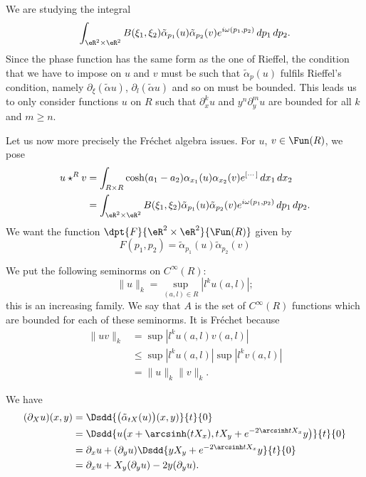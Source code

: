 We are studying the integral
\[ 
  \int_{\eR^2\times\eR^2} B(\xi_1,\xi_2)\tilde\alpha_{p_1}(u)\tilde\alpha_{p_2}(v)e^{i\omega(p_1,p_2)}\,dp_1\,dp_2.
\]
Since the phase function has the same form as the one of Rieffel, the condition that we have to impose on $u$ and $v$ must be such that $\tilde\alpha_p(u)$ fulfils Rieffel's condition, namely $\partial_{\xi}(\tilde\alpha u)$, $\partial_l(\tilde\alpha u)$ and so on must be bounded. This leads us to only consider functions $u$ on $R$ such that $\partial_x^ku$ and $y^n\partial^m_yu$ are bounded for all $k$ and $m\geq n$.


Let us now more precisely the Fréchet algebra issues. For $u$, $v\in\Fun(R)$, we pose
\[ 
\begin{aligned}
   u\star^R v&=\int_{R\times R} \cosh(a_1-a_2)\alpha_{x_1}(u)\alpha_{x_2}(v)e^{[\cdots]}\,dx_1\,dx_2\\
	&=\int_{\eR^2\times\eR^2}B(\xi_1,\xi_2)\tilde\alpha_{p_1}(u)\tilde\alpha_{p_2}(v)e^{i\omega(p_1,p_2)}\,dp_1\,dp_2.	
\end{aligned}
\]
We want the function $\dpt{ F }{ \eR^2\times\eR\sp 2 }{ \Fun(R) }$ given by
\[ 
  F(p_1,p_2)=\tilde\alpha_{p_1}(u)\tilde\alpha_{p_2}(v)
\]

We put the following seminorms on $ C^{\infty}(R)$:
\begin{equation}
\| u \|_k=\sup_{(a,l)\in R}| l^ku(a,l) |;
\end{equation}
this is an increasing family. We say that $A$ is the set of $ C^{\infty}(R)$ functions which are bounded for each of these seminorms. It is Fréchet because
\[ 
\begin{split}
\| uv \|_k&=\sup | l^ku(a,l)v(a,l) |\\
		&\leq \sup| l^ku(a,l) |\sup| l^kv(a,l) |\\
		&=\| u \|_k\| v \|_k.
\end{split}
\]

We have
\begin{equation}
\begin{split}
(\partial_X u)(x,y)&=\Dsdd{ \big( \tilde\alpha_{tX}(u) \big)(x,y) }{t}{0}\\
		&=\Dsdd{ u\big( x+\arcsinh(tX_x), tX_y+e^{-2\arcsinh tX_x}y \big) }{t}{0}\\
		&=\partial_x u+(\partial_yu)\Dsdd{ yX_y+e^{-2\arcsinh tX_x}y }{t}{0}\\
		&=\partial_xu+X_y(\partial_yu)-2 y(\partial_yu).
\end{split}
\end{equation}

